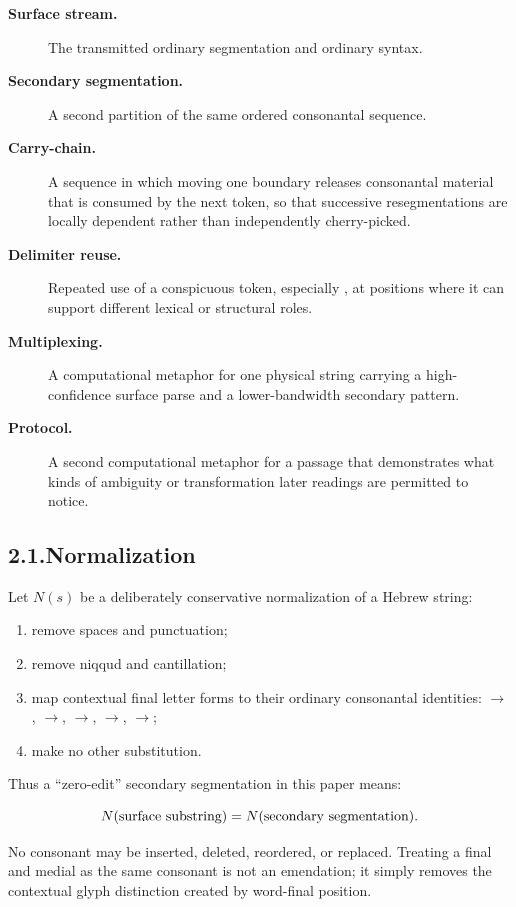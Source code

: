 \begin{description}
\item[\textbf{Surface stream.}] The transmitted ordinary segmentation and ordinary syntax.
\item[\textbf{Secondary segmentation.}] A second partition of the same ordered consonantal sequence.
\item[\textbf{Carry-chain.}] A sequence in which moving one boundary releases consonantal material that is consumed by the next token, so that successive resegmentations are locally dependent rather than independently cherry-picked.
\item[\textbf{Delimiter reuse.}] Repeated use of a conspicuous token, especially , at positions where it can support different lexical or structural roles.
\item[\textbf{Multiplexing.}] A computational metaphor for one physical string carrying a high-confidence surface parse and a lower-bandwidth secondary pattern.
\item[\textbf{Protocol.}] A second computational metaphor for a passage that demonstrates what kinds of ambiguity or transformation later readings are permitted to notice.
\end{description}

\subsection*{2.1.\quad Normalization}

Let \(N(s)\) be a deliberately conservative normalization of a Hebrew string:

\begin{enumerate}
\item remove spaces and punctuation;
\item remove niqqud and cantillation;
\item map contextual final letter forms to their ordinary consonantal identities:
\(\rightarrow\),
\(\rightarrow\),
\(\rightarrow\),
\(\rightarrow\),
\(\rightarrow\);
\item make no other substitution.
\end{enumerate}

Thus a ``zero-edit'' secondary segmentation in this paper means:

\[
N(\hbox{surface substring}) = N(\hbox{secondary segmentation}).
\]

No consonant may be inserted, deleted, reordered, or replaced.  Treating a final  and medial  as the same consonant is not an emendation; it simply removes the contextual glyph distinction created by word-final position.

